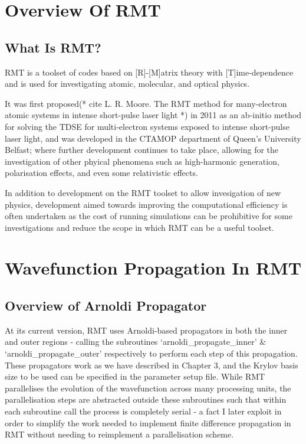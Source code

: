 \section{Overview Of RMT}
\subsection{What Is RMT?}
RMT is a toolset of codes based on [R]-[M]atrix theory with [T]ime-dependence and is used for investigating atomic, molecular, and optical physics. 

It was first proposed(* cite L. R. Moore. The RMT method for many-electron atomic systems in intense short-pulse laser light *) in 2011 as an ab-initio method for solving the TDSE for multi-electron systems exposed to intense short-pulse laser light, and was developed in the CTAMOP department of Queen's University Belfast; where further development continues to take place, allowing for the investigation of other phyical phenomena such as high-harmonic generation, polarisation effects, and even some relativistic effects. 

In addition to development on the RMT toolset to allow invesigation of new physics, development aimed towards improving the computational efficiency is often undertaken as the cost of running simulations can be prohibitive for some investigations and reduce the scope in which RMT can be a useful toolset.

\section{Wavefunction Propagation In RMT}
\subsection{Overview of Arnoldi Propagator}
At its current version, RMT uses Arnoldi-based propagators in both the inner and outer regions - calling the subroutines `arnoldi\_propagate\_inner' \& `arnoldi\_propagate\_outer' respectively to perform each step of this propagation. These propagators work as we have described in Chapter 3, and the Krylov basis size to be used can be specified in the parameter setup file. While RMT parallelises the evolution of the wavefunction across many processing units, the parallelisation steps are abstracted outside these subroutines such that within each subroutine call the process is completely serial - a fact I later exploit in order to simplify the work needed to implement finite difference propagation in RMT without needing to reimplement a parallelisation scheme.

